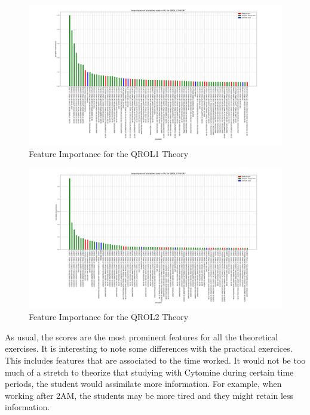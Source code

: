\documentclass[a4paper,11pt]{report}
\numberwithin{figure}{section} %
\begin{document}
      \begin{figure}[H]
      \centering
      \includegraphics[width=.95\linewidth]{plots/var_importance_QROL1_THEORY_2018-05-02_20_54_23.png}
      \caption{Feature Importance for the QROL1 Theory}
      \label{fig:var_th2}
      \end{figure}

      \begin{figure}[H]
      \centering
      \includegraphics[width=.95\linewidth]{plots/var_importance_QROL2_THEORY_2018-05-02_20_53_44.png}
      \caption{Feature Importance for the QROL2 Theory}
      \label{fig:var_th3}
      \end{figure}

    As usual, the scores are the most prominent features for all the theoretical exercises.
    It is interesting to note some differences with the practical exercices.
    This includes features that are associated to the time worked.
    It would not be too much of a stretch to theorize that studying with Cytomine during certain time periods, the student would assimilate more information.
    For example, when working after 2AM, the students may be more tired and they might retain less information.\\
\end{document}
